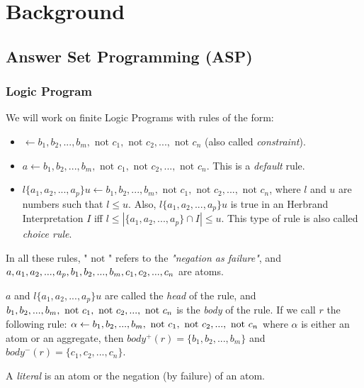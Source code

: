\chapter{Background}

\section{Answer Set Programming (ASP)}

\subsection{Logic Program}

We will work on finite Logic Programs with rules of the form:
\begin{itemize}
\item $\leftarrow b_1, b_2, ..., b_m, \text{ not } c_1, \text{ not } c_2,...,\text{ not } c_n$ (also called \textit{constraint}).
\item $a \leftarrow b_1, b_2, ..., b_m, \text{ not } c_1, \text{ not } c_2,...,\text{ not } c_n$. This is a \textit{default} rule.
\item $l\{a_1, a_2, ..., a_p\}u \leftarrow b_1, b_2, ..., b_m, \text{ not } c_1, \text{ not } c_2,...,\text{ not } c_n$, where $l$ and $u$ are numbers such that $l \leq u$. Also, $l\{a_1, a_2, ..., a_p\}u$ is true in an Herbrand Interpretation $I$ iff $ l \leq |\{a_1, a_2, ..., a_p\}\cap I | \leq u$. This type of rule is also called \textit{choice rule}.
\end{itemize}
In all these rules, "$\text{ not }$" refers to the \textit{"negation as failure"}, and $a, a_1, a_2, ..., a_p, b_1, b_2,\\ ..., b_m, c_1, c_2, ...,  c_n$ are atoms. 

\smallskip

$a$ and $l\{a_1, a_2, ..., a_p\}u$ are called the \textit{head} of the rule, and $b_1, b_2, ..., b_m, \text{ not } c_1, \text{ not } c_2,\\..., \text{ not } c_n$ is the \textit{body} of the rule. If we call $r$ the following rule: $\alpha \leftarrow b_1, b_2, ..., b_m,\\ \text{ not } c_1, \text{ not } c_2,...,\text{ not } c_n$ where $\alpha$ is either an atom or an aggregate, then $body^+(r)=\{b_1, b_2,...,b_m \}$ and $body^-(r)=\{c_1, c_2,...,c_n \}$.

\smallskip

A \textit{literal} is an atom or the negation (by failure) of an atom.

